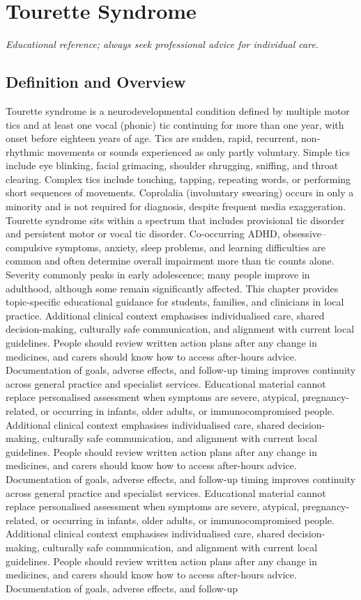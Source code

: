 \chapter{Tourette Syndrome}
\medskip
\noindent\textit{Educational reference; always seek professional advice for individual care.}

\section*{Definition and Overview}
Tourette syndrome is a neurodevelopmental condition defined by multiple motor tics and at least one vocal (phonic) tic continuing for more than one year, with onset before eighteen years of age. Tics are sudden, rapid, recurrent, non-rhythmic movements or sounds experienced as only partly voluntary. Simple tics include eye blinking, facial grimacing, shoulder shrugging, sniffing, and throat clearing. Complex tics include touching, tapping, repeating words, or performing short sequences of movements. Coprolalia (involuntary swearing) occurs in only a minority and is not required for diagnosis, despite frequent media exaggeration. Tourette syndrome sits within a spectrum that includes provisional tic disorder and persistent motor or vocal tic disorder. Co-occurring ADHD, obsessive--compulsive symptoms, anxiety, sleep problems, and learning difficulties are common and often determine overall impairment more than tic counts alone. Severity commonly peaks in early adolescence; many people improve in adulthood, although some remain significantly affected. This chapter provides topic-specific educational guidance for students, families, and clinicians in local practice. Additional clinical context emphasises individualised care, shared decision-making, culturally safe communication, and alignment with current local guidelines. People should review written action plans after any change in medicines, and carers should know how to access after-hours advice. Documentation of goals, adverse effects, and follow-up timing improves continuity across general practice and specialist services. Educational material cannot replace personalised assessment when symptoms are severe, atypical, pregnancy-related, or occurring in infants, older adults, or immunocompromised people. Additional clinical context emphasises individualised care, shared decision-making, culturally safe communication, and alignment with current local guidelines. People should review written action plans after any change in medicines, and carers should know how to access after-hours advice. Documentation of goals, adverse effects, and follow-up timing improves continuity across general practice and specialist services. Educational material cannot replace personalised assessment when symptoms are severe, atypical, pregnancy-related, or occurring in infants, older adults, or immunocompromised people. Additional clinical context emphasises individualised care, shared decision-making, culturally safe communication, and alignment with current local guidelines. People should review written action plans after any change in medicines, and carers should know how to access after-hours advice. Documentation of goals, adverse effects, and follow-up 